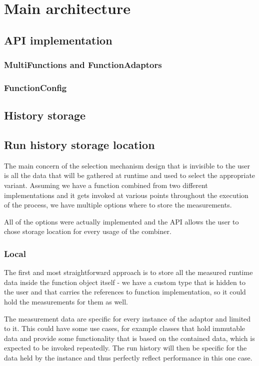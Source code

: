 \section{Main architecture}
\subsection{API implementation}
\subsubsection{MultiFunctions and FunctionAdaptors}
\subsubsection{FunctionConfig}
\subsection{History storage}

\subsection{Run history storage location}
\label{subsec:storing}

The main concern of the selection mechanism design that is invisible to the user is all the data that will be gathered at runtime and used to select the appropriate variant. Assuming we have a function combined from two different implementations and it gets invoked at various points throughout the execution of the process, we have multiple options where to store the measurements.

All of the options were actually implemented and the API allows the user to chose storage location for every usage of the combiner.

\subsubsection{Local}

The first and most straightforward approach is to store all the measured runtime data inside the function object itself - we have a custom type  that is hidden to the user and that carries the references to function implementation, so it could hold the measurements for them as well.

The measurement data are specific for every instance of the adaptor and limited to it. This could have some use cases, for example classes that hold immutable data and provide some functionality that is based on the contained data, which is expected to be invoked repeatedly. The run history will then be specific for the data held by the instance and thus perfectly reflect performance in this one case.

